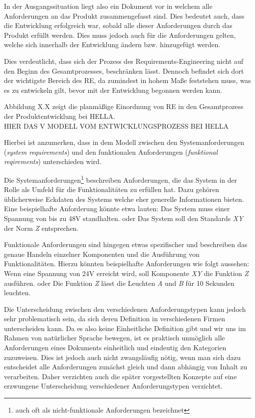 \documentclass[12pt]{report}
\begin{document}
In der Ausgangssituation liegt also ein Dokument vor in welchem alle Anforderungen an das Produkt zusammengefasst sind. Dies bedeutet auch, dass die Entwicklung erfolgreich war, sobald alle dieser Anforderungen durch das Produkt erfüllt werden. Dies muss jedoch auch für die Anforderungen gelten, welche sich innerhalb der Entwicklung ändern bzw. hinzugefügt werden.

Dies verdeutlicht, dass sich der Prozess des Requirements-Engineering nicht auf den Beginn des Gesamtprozesses, beschränken lässt. Dennoch befindet sich dort der wichtigste Bereich des RE, da zumindest in hohem Maße feststehen muss, was es zu entwickeln gilt, bevor mit der Entwicklung begonnen werden kann.

Abbildung X.X zeigt die planmäßige Einordnung von RE in den Gesamtprozess der Produktentwicklung bei HELLA. 
\\
\newline
HIER DAS V MODELL VOM ENTWICKLUNGSPROZESS BEI HELLA
\\
\newline

Hierbei ist anzumerken, dass in dem Modell zwischen den Systemanforderungen (\textit{system requirements}) und den funktionalen Anforderungen (\textit{funktional reqirements}) unterschieden wird. 

Die Systemanforderungen\footnote{auch oft als nicht-funktionale Anforderungen bezeichnet} beschreiben Anforderungen, die das System in der Rolle als Umfeld für die Funktionalitäten zu erfüllen hat. Dazu gehören üblicherweise Eckdaten des Systems welche eher generelle Informationen bieten. Eine beispielhafte Anforderung könnte etwa lauten: \glqq Das System muss einer Spannung von bis zu 48V standhalten.\grqq{} oder \glqq Das System soll den Standards \textit{XY} der Norm \textit{Z} entsprechen.\grqq

Funktionale Anforderungen sind hingegen etwas spezifischer und beschreiben das genaue Handeln einzelner Komponenten und die Ausführung von Funktionalitäten. Hierzu könnten beispielhafte Anforderungen wie folgt aussehen: \glqq Wenn eine Spannung von 24V erreicht wird, soll Komponente \textit{XY} die Funktion \textit{Z} ausführen.\grqq{} oder \glqq Die Funktion \textit{Z} lässt die Leuchten \textit{A} und \textit{B} für 10 Sekunden leuchten.\grqq

Die Unterscheidung zwischen den verschiedenen Anforderungstypen kann jedoch sehr problematisch sein, da sich deren Definition in verschiedenen Firmen unterscheiden kann. Da es also keine Einheitliche Definition gibt und wir uns im Rahmen von natürlicher Sprache bewegen, ist es praktisch unmöglich alle Anforderungen eines Dokuments einheitlich und eindeutig den Kategorien zuzuweisen. Dies ist jedoch auch nicht zwangsläufig nötig, wenn man sich dazu entscheidet alle Anforderungen zunächst gleich und dann abhängig von Inhalt zu verarbeiten. Daher verzichten auch die später vorgestellten Konzepte auf eine erzwungene Unterscheidung verschiedener Anforderungstypen verzichtet.
\end{document}
